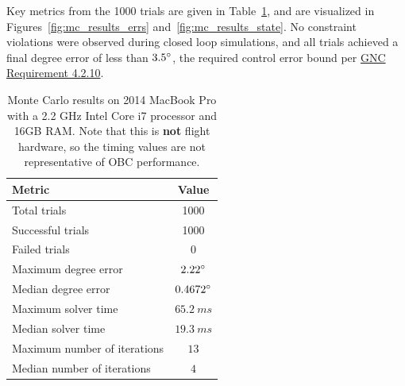 \documentclass[10pt]{article}
\begin{document}
Key metrics from the 1000 trials are given in Table~\ref{tab:mc_results}, and are visualized in Figures~\ref{fig:mc_results_errs} and~\ref{fig:mc_results_state}. No constraint violations were observed during closed loop simulations, and all trials achieved a final degree error of less than $3.5^{\circ}$, the required control error bound per \href{https://docs.google.com/document/d/1SgZlPZIc5EONQ8ZSHsm3SXJ8XMwuNXoFASMoSIeQAhw/edit#heading=h.ybip8qn9pig1}{GNC Requirement 4.2.10}.

\begin{table}
\centering
\caption{Monte Carlo results on 2014 MacBook Pro with a 2.2 GHz Intel Core i7 processor and 16GB RAM. Note that this is \textbf{not} flight hardware, so the timing values are not representative of OBC performance.}
\label{tab:mc_results}
\begin{tabular}{lc}
\textbf{Metric} & \textbf{Value} \\ \hline\hline
Total trials & 1000 \\
Successful trials & 1000 \\
Failed trials & 0 \\
Maximum degree error & $2.22^{\circ}$\\ 
Median degree error & $0.4672^{\circ}$ \\ 
Maximum solver time & $65.2~\unit{ms}$ \\
Median solver time & $19.3~\unit{ms}$\\
Maximum number of iterations & $13$\\
Median number of iterations & $4$
\end{tabular}
\end{table}
\end{document}
